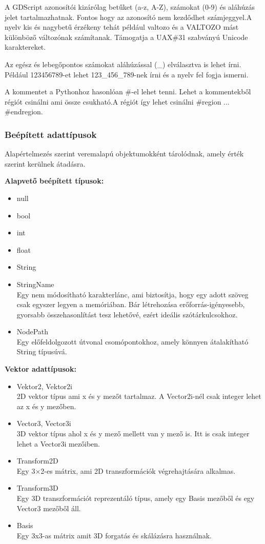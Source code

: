 \documentclass[
]{thesis-ekf}
\theoremstyle{definition}
\theoremstyle{remark}
\begin{document}
A GDScript azonosítói kizárólag betűket (a-z, A-Z), számokat (0-9) és aláhúzás jelet tartalmazhatnak. Fontos hogy az azonosító nem kezdődhet számjeggyel.A nyelv kis és nagybetű érzékeny tehát például valtozo és a VALTOZO mást különböző változónak számítanak. Támogatja a  UAX\#31 szabványú Unicode karaktereket.

Az egész és lebegőpontos számokat aláhúzással (\_) elválasztva is lehet írni. Például 123456789-et lehet 123\_456\_789-nek írni és a nyelv fel fogja ismerni.

A kommentet a Pythonhoz hasonlóan \#-el lehet tenni. Lehet a kommentekből régiót csinálni ami össze csukható.A régiót így lehet csinálni \#region ... \#endregion. \cite{GDScript}

\subsubsection*{Beépített adattípusok}
Alapértelmezés szerint veremalapú objektumokként tárolódnak, amely érték szerint kerülnek átadásra.

\textbf{Alapvető beépített típusok:}
\begin{itemize}
	\item null
	\item bool
	\item int
	\item float
	\item String
	\item StringName \\ Egy nem módosítható karakterlánc, ami biztosítja, hogy egy adott szöveg csak egyszer legyen a memóriában. Bár létrehozása erőforrás-igényesebb, gyorsabb összehasonlítást tesz lehetővé, ezért ideális szótárkulcsokhoz.
	\item NodePath \\ Egy előfeldolgozott útvonal csomópontokhoz, amely könnyen átalakítható String típusúvá. 
\end{itemize}
\textbf{Vektor adattípusok:}
\begin{itemize}
	\item Vektor2, Vektor2i \\ 2D vektor típus ami x és y mezőt tartalmaz. A Vector2i-nél csak integer lehet az x és y mezőben.
	\item Vector3, Vector3i \\ 3D vektor típus ahol x és y mező mellett van y mező is. Itt is csak integer lehet a Vector3i mezőiben.
	\item Transform2D \\ Egy 3×2-es mátrix, ami 2D transzformációk végrehajtására alkalmas. 
	\item Transform3D \\ Egy 3D transzformációt reprezentáló típus, amely egy Basis mezőből és egy Vector3 mezőből áll.
	\item Basis \\ Egy 3x3-as mátrix amit 3D forgatás és skálázásra használnak.
\end{itemize}
\end{document}
